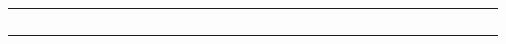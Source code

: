 \documentclass[12pt]{article}
\begin{document}
\begin{longtable}{|l|p{2.75cm}|p{2.75cm}|p{2.75cm}|l|p{1.5cm}|l|l|l|l|l|l|l|l|l|l|l|l|l|l|l|l|l|l|l|l|l|l|l|l|l|l|l|l|l|}
\rule{0cm}{0.75cm} & \relax & \relax & \relax & \relax & \relax & \relax & & & & & & & & & & & & & & & & & & & & & & & & & & & &\\ \hline
\rule{0cm}{0.75cm} & \relax & \relax & \relax & \relax & \relax & \relax & & & & & & & & & & & & & & & & & & & & & & & & & & & &\\ \hline
\rule{0cm}{0.75cm} & \relax & \relax & \relax & \relax & \relax & \relax & & & & & & & & & & & & & & & & & & & & & & & & & & & &\\ \hline
\rule{0cm}{0.75cm} & \relax & \relax & \relax & \relax & \relax & \relax & & & & & & & & & & & & & & & & & & & & & & & & & & & &\\ \hline
\rule{0cm}{0.75cm} & \relax & \relax & \relax & \relax & \relax & \relax & & & & & & & & & & & & & & & & & & & & & & & & & & & &\\ \hline
\rule{0cm}{0.75cm} & \relax & \relax & \relax & \relax & \relax & \relax & & & & & & & & & & & & & & & & & & & & & & & & & & & &\\ \hline
\end{longtable}

\pagebreak
\end{document}
